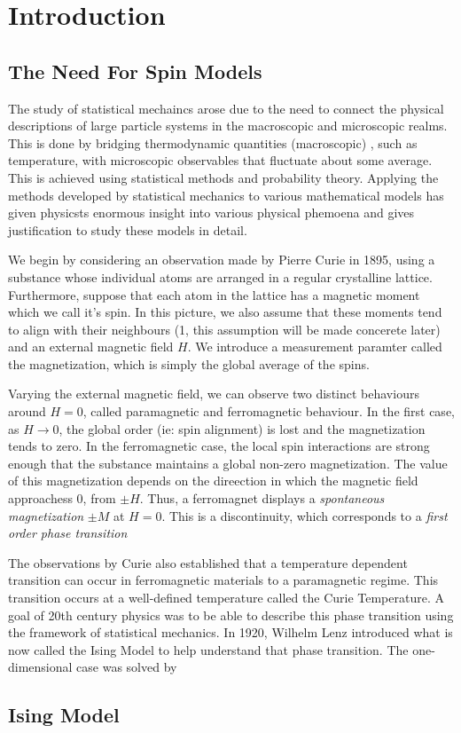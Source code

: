\chapter{Introduction}
	\section{The Need For Spin Models}
	The study of statistical mechaincs arose due to the need to connect the physical descriptions
	of large particle systems in the macroscopic and microscopic realms. This is done by bridging 
	thermodynamic quantities (macroscopic) , such as temperature, with microscopic
	observables that fluctuate about some average. This is achieved using statistical methods and 
	probability theory. Applying the methods developed by statistical mechanics to various mathematical 
	models has given physicsts enormous insight into various physical phemoena and gives justification 
	to study these models in detail. 

	We begin by considering an observation made by Pierre Curie in 1895, using a substance 
	whose individual atoms are arranged in a regular crystalline lattice. Furthermore, 
	suppose that each atom in the lattice has a magnetic moment which we call it's spin. In 
	this picture, we also assume that these moments tend to align with their neighbours
	(1, this assumption will be made concerete later) and an external magnetic field $H$. We introduce
	a measurement paramter called the magnetization, which is simply the global average of the spins.

	Varying the external magnetic field, we can observe two distinct behaviours around $H=0$, called
	paramagnetic and ferromagnetic behaviour. In the first case, as $H \rightarrow 0$, the global 
	order (ie: spin alignment) is lost and the magnetization tends to zero. In the ferromagnetic case, 
	the local spin interactions are strong enough that the substance maintains a global non-zero 
	magnetization. The value of this magnetization depends on the direection in which the magnetic field
	approachess $0$, from $\pm H$. Thus, a ferromagnet displays a \textit{spontaneous magnetization} 
	$\pm M$ at $H=0$. This is a discontinuity, which corresponds to a \textit{first order phase transition}

	The observations by Curie also established that a temperature dependent transition can occur in 
	ferromagnetic materials to a paramagnetic regime. This transition occurs at a well-defined 
	temperature called the Curie Temperature. A goal of 20th century physics was to be able to describe
	this phase transition using the framework of statistical mechanics. In 1920, Wilhelm Lenz introduced
	what is now called the Ising Model to help understand that phase transition. The one-dimensional case
	was solved by 

	
	 

	\section{Ising Model}

